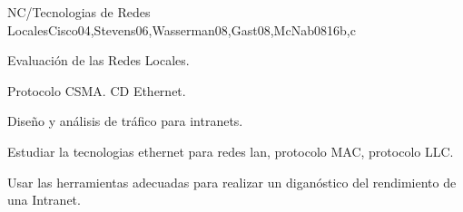 \begin{syllabus}
   \begin{unit}{NC/Tecnologias de Redes Locales}{}{Cisco04,Stevens06,Wasserman08,Gast08,McNab08}{16}{b,c}
      \begin{topics}
         \item Evaluación de las  Redes  Locales.
         \item Protocolo CSMA. CD Ethernet.
         \item Diseño y  análisis de  tráfico para intranets.
      \end{topics}
   
      \begin{learningoutcomes}
         \item Estudiar la tecnologias  ethernet  para redes lan, protocolo MAC, protocolo LLC.
         \item Usar las  herramientas  adecuadas para realizar un diganóstico del rendimiento de una Intranet.
      \end{learningoutcomes}
   \end{unit}
   
   \begin{coursebibliography}
   \end{coursebibliography}
   
   \end{syllabus}
   